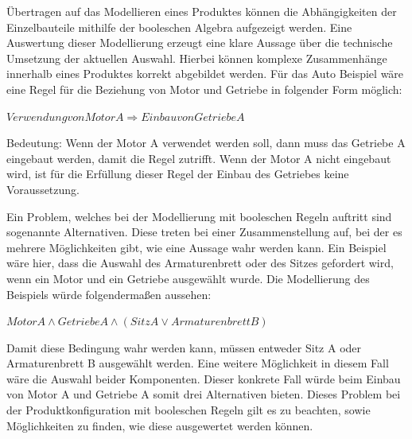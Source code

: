 Übertragen auf das Modellieren eines Produktes können die Abhängigkeiten der Einzelbauteile mithilfe der booleschen Algebra aufgezeigt werden. Eine Auswertung dieser Modellierung erzeugt eine klare Aussage über die technische Umsetzung der aktuellen Auswahl. Hierbei können komplexe Zusammenhänge innerhalb eines Produktes korrekt abgebildet werden. Für das Auto Beispiel wäre eine Regel für die Beziehung von Motor und Getriebe in folgender Form möglich: \par
\begin{center}
$ Verwendung von Motor A    \Rightarrow Einbau von Getriebe A $
\end{center} \par
Bedeutung: Wenn der Motor A verwendet werden soll, dann muss das Getriebe A eingebaut werden, damit die Regel zutrifft. Wenn der Motor A nicht eingebaut wird, ist für die Erfüllung dieser Regel der Einbau des Getriebes keine Voraussetzung. 
\par
Ein Problem, welches bei der Modellierung mit booleschen Regeln auftritt sind sogenannte Alternativen. Diese treten bei einer Zusammenstellung auf, bei der es mehrere Möglichkeiten gibt, wie eine Aussage wahr werden kann. Ein Beispiel wäre hier, dass die Auswahl des Armaturenbrett oder des Sitzes gefordert wird, wenn ein Motor und ein Getriebe ausgewählt wurde. Die Modellierung des Beispiels würde folgendermaßen aussehen: \par
\begin{center}
$ Motor A \wedge Getriebe A \wedge (Sitz A \vee Armaturenbrett B )  $
\end{center} \par
Damit diese Bedingung wahr werden kann, müssen entweder Sitz A oder Armaturenbrett B ausgewählt werden. Eine weitere Möglichkeit in diesem Fall wäre die Auswahl beider Komponenten. Dieser konkrete Fall würde beim Einbau von Motor A und Getriebe A somit drei Alternativen bieten. Dieses Problem bei der Produktkonfiguration mit booleschen Regeln gilt es zu beachten, sowie Möglichkeiten zu finden, wie diese ausgewertet werden können.

